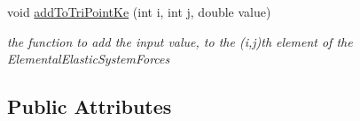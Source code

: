 \begin{DoxyCompactItemize}
\item 
\hypertarget{classShapeBase_a2e8e11261fb35bc925259151218eebf3}{}void \hyperlink{classShapeBase_a2e8e11261fb35bc925259151218eebf3}{add\+To\+Tri\+Point\+Ke} (int i, int j, double value)\label{classShapeBase_a2e8e11261fb35bc925259151218eebf3}

\begin{DoxyCompactList}\small\item\em the function to add the input value, to the (i,j)th element of the Elemental\+Elastic\+System\+Forces \end{DoxyCompactList}\end{DoxyCompactItemize}
\subsection*{Public Attributes}
